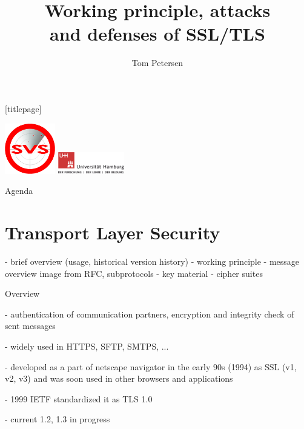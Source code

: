 


\title{Working principle, attacks\\ and defenses of SSL/TLS}
\author[Tom Petersen]{Tom Petersen}
\date{}%



\begingroup
	[titlepage]
	\begin{frame}[plain]
		\vskip8mm
		\includegraphics[width=2.2cm]{pic/svs_logo_hires-ohne-was.png}
		 \vskip-20mm %
		\titlepage
		\vspace{\fill}
		\includegraphics[width=2.9cm]{pic/UHH-Logo_2010_Farbe_RGB_hires_nomargin.png}
		\vskip20pt
	\end{frame}
\endgroup

\begin{frame}{Agenda}
	\tableofcontents
\end{frame}

\section{Transport Layer Security}

- brief overview (usage, historical version history)
- working principle 
	- message overview image from RFC, subprotocols
	- key material
	- cipher suites

\begin{frame}{Overview}

- authentication of communication partners, encryption and integrity check of sent messages

- widely used in HTTPS, SFTP, SMTPS, ... 

- developed as a part of netscape navigator in the early 90s (1994) as SSL (v1, v2, v3) and was soon used in other browsers and applications

- 1999 IETF standardized it as TLS 1.0

- current 1.2, 1.3 in progress

\end{frame}

